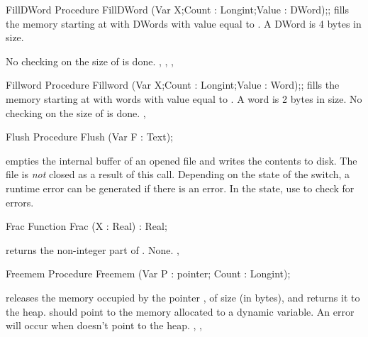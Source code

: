 
\begin{procedure}{FillDWord}
\Declaration
Procedure FillDWord (Var X;Count : Longint;Value : DWord);;
\Description
{} fills the memory starting at  with  DWords
with value equal to . A DWord is 4 bytes in size.

\Errors
No checking on the size of  is done.
\SeeAlso
{}, , , 
\end{procedure}


\begin{procedure}{Fillword}
\Declaration
Procedure Fillword (Var X;Count : Longint;Value : Word);;
\Description
{} fills the memory starting at  with  words
with value equal to . A word is 2 bytes in size.
\Errors
No checking on the size of  is done.
\SeeAlso
{}, 
\end{procedure}


\begin{procedure}{Flush}
\Declaration
Procedure Flush (Var F : Text);

\Description
{} empties the internal buffer of an opened file  and writes the
contents to disk. The file is \textit{not} closed as a result of this call.
\Errors
Depending on the state of the  switch, a runtime error can be 
generated if there is an error. In the  state, use 
to check for errors.
\SeeAlso
{}
\end{procedure}


\begin{function}{Frac}
\Declaration
Function Frac (X : Real) : Real;

\Description
{} returns the non-integer part of .
\Errors
None.
\SeeAlso
{}, 
\end{function}


\begin{procedure}{Freemem}
\Declaration
Procedure Freemem (Var P : pointer; Count : Longint);

\Description
{} releases the memory occupied by the pointer , of size
 (in bytes), and returns it to the heap.  should point to the memory
allocated to a dynamic variable.
\Errors
An error will occur when  doesn't point to the heap.
\SeeAlso
{}, , 
\end{procedure}

